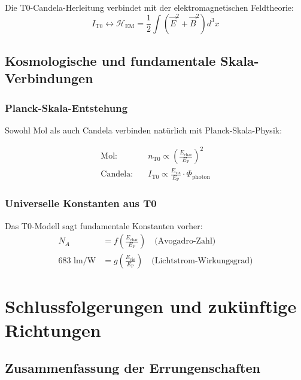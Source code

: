 \documentclass[12pt,a4paper]{article}
\newcommand{\EP}{E_{\text{P}}}
\newcommand{\Echar}{E_{\text{char}}}
\newcommand{\Evis}{E_{\text{vis}}}
\newcommand{\Phiphoton}{\Phi_{\text{photon}}}
\begin{document}
	Die T0-Candela-Herleitung verbindet mit der elektromagnetischen Feldtheorie:
	\begin{equation}
		I_{\text{T0}} \leftrightarrow \mathcal{H}_{\text{EM}} = \frac{1}{2}\int (\vec{E}^2 + \vec{B}^2) d^3x
		\label{eq:candela_em_verbindung}
	\end{equation}
	
	\subsection{Kosmologische und fundamentale Skala-Verbindungen}
	\label{subsec:kosmologische_verbindungen}
	
	\subsubsection{Planck-Skala-Entstehung}
	\label{subsubsec:planck_skala_entstehung}
	
	Sowohl Mol als auch Candela verbinden natürlich mit Planck-Skala-Physik:
	
	\begin{align}
		\text{Mol:} \quad &n_{\text{T0}} \propto \left(\frac{\Echar}{\EP}\right)^2 \\
		\text{Candela:} \quad &I_{\text{T0}} \propto \frac{\Evis}{\EP} \cdot \Phiphoton
	\end{align}
	
	\subsubsection{Universelle Konstanten aus T0}
	\label{subsubsec:universelle_konstanten_t0}
	
	Das T0-Modell sagt fundamentale Konstanten vorher:
	\begin{align}
		N_A &= f\left(\frac{\Echar}{\EP}\right) \quad \text{(Avogadro-Zahl)} \\
		683 \text{ lm/W} &= g\left(\frac{\Evis}{\EP}\right) \quad \text{(Lichtstrom-Wirkungsgrad)}
	\end{align}
	
	\section{Schlussfolgerungen und zukünftige Richtungen}
	\label{sec:schlussfolgerungen}
	
	\subsection{Zusammenfassung der Errungenschaften}
	\label{subsec:zusammenfassung_errungenschaften}
	
\end{document}
